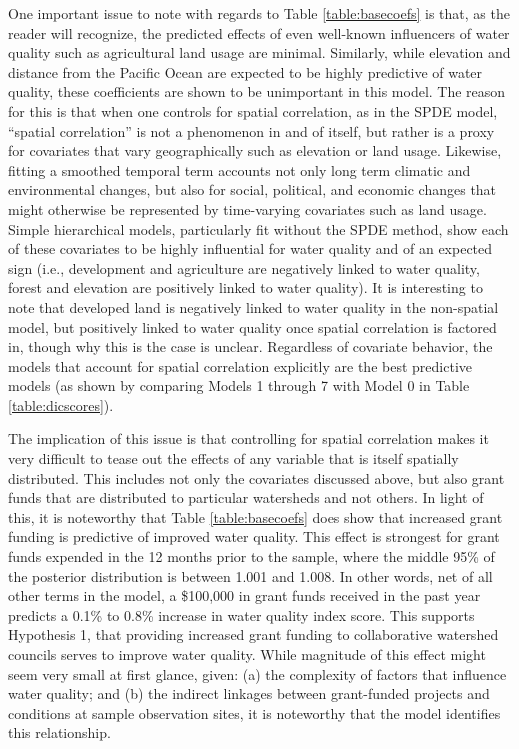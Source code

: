 \documentclass[11pt,a4paper,titlepage]{article}
\begin{document}


One important issue to note with regards to Table \ref{table:basecoefs} is that, as the reader will recognize, the predicted effects of even well-known influencers of water quality such as agricultural land usage are minimal. Similarly, while elevation and distance from the Pacific Ocean are expected to be highly predictive of water quality, these coefficients are shown to be unimportant in this model. The reason for this is that when one controls for spatial correlation, as in the SPDE model, “spatial correlation” is not a phenomenon in and of itself, but rather is a proxy for covariates that vary geographically such as elevation or land usage. Likewise, fitting a smoothed temporal term accounts not only long term climatic and environmental changes, but also for social, political, and economic changes that might otherwise be represented by time-varying covariates such as land usage. Simple hierarchical models, particularly fit without the SPDE method, show each of these covariates to be highly influential for water quality and of an expected sign (i.e., development and agriculture are negatively linked to water quality, forest and elevation are positively linked to water quality). It is interesting to note that developed land is negatively linked to water quality in the non-spatial model, but positively linked to water quality once spatial correlation is factored in, though why this is the case is unclear. Regardless of covariate behavior, the models that account for spatial correlation explicitly are the best predictive models (as shown by comparing Models 1 through 7 with Model 0 in Table \ref{table:dicscores}).

The implication of this issue is that controlling for spatial correlation makes it very difficult to tease out the effects of any variable that is itself spatially distributed. This includes not only the covariates discussed above, but also grant funds that are distributed to particular watersheds and not others. In light of this, it is noteworthy that Table \ref{table:basecoefs} does show that increased grant funding is predictive of improved water quality. This effect is strongest for grant funds expended in the 12 months prior to the sample, where the middle 95\% of the posterior distribution is between 1.001 and 1.008. In other words, net of all other terms in the model, a \$100,000 in grant funds received in the past year predicts a 0.1\% to 0.8\% increase in water quality index score. This supports Hypothesis 1, that providing increased grant funding to collaborative watershed councils serves to improve water quality. While magnitude of this effect might seem very small at first glance, given: (a) the complexity of factors that influence water quality; and (b) the indirect linkages between grant-funded projects and conditions at sample observation sites, it is noteworthy that the model identifies this relationship. 
\end{document}
